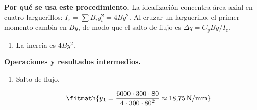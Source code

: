 \noindent\textbf{Por qué se usa este procedimiento.} La idealización concentra área axial en cuatro larguerillos: $I_z=\sum B_i y_i^2=4By^2$. Al cruzar un larguerillo, el primer momento cambia en $By$, de modo que el salto de flujo es $\Delta q=C_yBy/I_z$.

\begin{enumerate}

\item La inercia es $4 B y^2$.

\end{enumerate}

\noindent\textbf{Operaciones y resultados intermedios.}

\begin{enumerate}

\item Salto de flujo.

\[\fitmath{y_{1}=\frac{6000\cdot 300\cdot 80}{4\cdot 300\cdot {80}^{2}}\approx 18{,}75\,\mathrm{N/mm}}\]

\end{enumerate}
